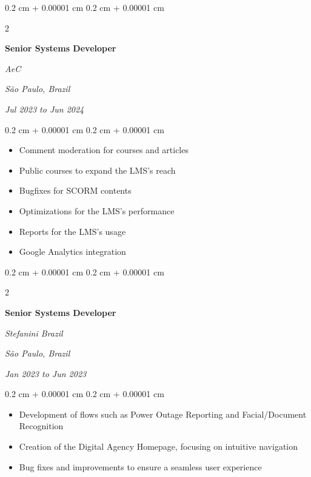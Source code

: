 \documentclass[10pt, a4paper]{article}
\newenvironment{highlights}{
    \begin{itemize}[
        topsep=0.10 cm,
        parsep=0.10 cm,
        partopsep=0pt,
        itemsep=0pt,
        leftmargin=0.4 cm + 10pt
    ]
}{
    \end{itemize}
} %
\newenvironment{onecolentry}{
    \begin{adjustwidth}{
        0.2 cm + 0.00001 cm
    }{
        0.2 cm + 0.00001 cm
    }
}{
    \end{adjustwidth}
} %
\newenvironment{twocolentry}[2][]{
    \onecolentry
    \def\secondColumn{#2}
    \setcolumnwidth{\fill, 7 cm}
    \begin{paracol}{2}
}{
    \switchcolumn \raggedleft \secondColumn
    \end{paracol}
    \endonecolentry
} %
\begin{document}
        \vspace{0.2 cm}

        \begin{twocolentry}{
        \textit{São Paulo, Brazil}    
            
        \textit{Jul 2023 to Jun 2024}}
            \textbf{Senior Systems Developer}
            
            \textit{AeC}
        \end{twocolentry}

        \vspace{0.10 cm}
        \begin{onecolentry}
            \begin{highlights}
                \item Comment moderation for courses and articles
                \item Public courses to expand the LMS's reach
                \item Bugfixes for SCORM contents
                \item Optimizations for the LMS's performance
                \item Reports for the LMS's usage
                \item Google Analytics integration
            \end{highlights}
        \end{onecolentry}


        \vspace{0.2 cm}

        \begin{twocolentry}{
        \textit{São Paulo, Brazil}    
            
        \textit{Jan 2023 to Jun 2023}}
            \textbf{Senior Systems Developer}
            
            \textit{Stefanini Brazil}
        \end{twocolentry}

        \vspace{0.10 cm}
        \begin{onecolentry}
            \begin{highlights}
                \item Development of flows such as Power Outage Reporting and Facial/Document Recognition
                \item Creation of the Digital Agency Homepage, focusing on intuitive navigation
                \item Bug fixes and improvements to ensure a seamless user experience
            \end{highlights}
        \end{onecolentry}
\end{document}
